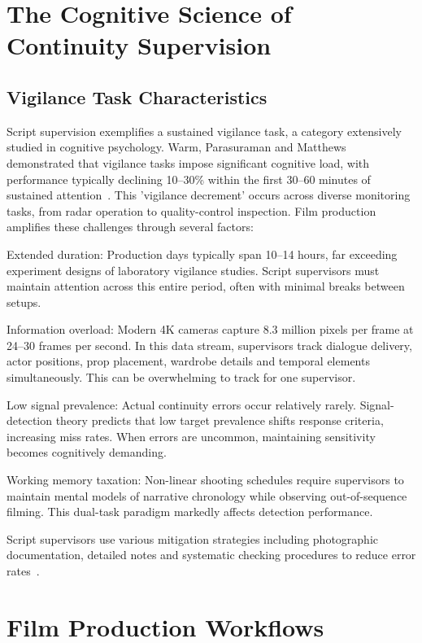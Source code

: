 \section{The Cognitive Science of Continuity Supervision}

\subsection{Vigilance Task Characteristics}

Script supervision exemplifies a sustained vigilance task, a category extensively studied in cognitive psychology. Warm, Parasuraman and Matthews demonstrated that vigilance tasks impose significant cognitive load, with performance typically declining 10–30\% within the first 30–60 minutes of sustained attention~\cite{see1997}. This 'vigilance decrement' occurs across diverse monitoring tasks, from radar operation to quality-control inspection. Film production amplifies these challenges through several factors:

Extended duration: Production days typically span 10–14 hours, far exceeding experiment designs of laboratory vigilance studies. Script supervisors must maintain attention across this entire period, often with minimal breaks between setups.

Information overload: Modern 4K cameras capture 8.3 million pixels per frame at 24–30 frames per second. In this data stream, supervisors track dialogue delivery, actor positions, prop placement, wardrobe details and temporal elements simultaneously. This can be overwhelming to track for one supervisor.

Low signal prevalence: Actual continuity errors occur relatively rarely. Signal-detection theory predicts that low target prevalence shifts response criteria, increasing miss rates. When errors are uncommon, maintaining sensitivity becomes cognitively demanding.

Working memory taxation: Non-linear shooting schedules require supervisors to maintain mental models of narrative chronology while observing out-of-sequence filming. This dual-task paradigm markedly affects detection performance.

Script supervisors use various mitigation strategies including photographic documentation, detailed notes and systematic checking procedures to reduce error rates~\cite{grier2003}.

\section{Film Production Workflows}

